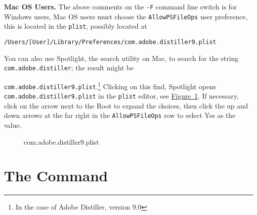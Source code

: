 \documentclass[12pt]{article}
\makeatletter
\renewenvironment{quote}[1][]
   {\def\@rgi{#1}\ifx\@rgi\@empty
    \let\rghtm\@empty\else\def\rghtm{\rightmargin\leftmargin}\fi
    \list{}{\rghtm} %
    \item\relax}
   {\endlist}
\makeatother
\begin{document}
\newtopic \textbf{Mac OS Users.} The above comments on the \texttt{-F} command line switch
is for Windows users, Mac OS users must choose the \texttt{AllowPSFileOps} user preference, this is located
in the \texttt{plist}, possibly located at
\begin{Verbatim}[fontsize=\small]
/Users/[User]/Library/Preferences/com.adobe.distiller9.plist
\end{Verbatim}
You can also use Spotlight, the search utility on Mac, to search for the string \texttt{com.adobe.distiller};
the result might be
\begin{quote}
\texttt{com.adobe.distiller9.plist}.\footnote{In the case of Adobe Distiller, version 9.0}
\end{quote}
Clicking on this find,
Spotlight opens \texttt{com.adobe.distiller9.plist} in the \texttt{plist} editor, see \hyperref[plist]{Figure~\ref*{plist}}.
If necessary, click on the arrow next to the Root to expand the
choices, then click the up and down arrows at the far
right in the \texttt{AllowPSFileOps} row to select Yes as the value.
\begin{figure}[hbt]\setlength{\fboxsep}{0pt}
\begin{center}
\caption{com.adobe.distiller9.plist}\label{plist}
\end{center}
\end{figure}

\section{The \texorpdfstring{\protect{}}{} Command}
\end{document}
